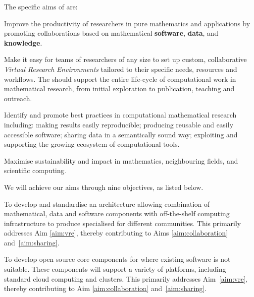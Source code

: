 \documentclass[noworkareas,deliverables,\classoptions]{euproposal}       %
\begin{document}
\begin{proposal}
The specific aims of \TheProject are:
\begin{compactenum}
\item \label{aim:collaboration} Improve the productivity of
  researchers in pure mathematics and applications by promoting
  collaborations based on mathematical \textbf{software},
  \textbf{data}, and \textbf{knowledge}.
\item \label{aim:vre} Make it easy for teams of researchers of any
  size to set up custom, collaborative \emph{Virtual Research
    Environments} tailored to their specific needs, resources and
  workflows. The \VREs should support the entire life-cycle of
  computational work in mathematical research, from initial
  exploration to publication, teaching and outreach.
\item \label{aim:sharing} Identify and promote best practices in
  computational mathematical research including: making results easily
  reproducible; producing reusable and easily accessible
  software; sharing data in a semantically sound way; exploiting and
  supporting the growing ecosystem of computational tools.
\item \label{aim:impact} Maximise sustainability and impact in
  mathematics, neighbouring fields, and scientific computing.
\end{compactenum}

We will achieve our aims through nine objectives, as listed below.

\begin{compactenum}
\item\label{objective:framework} To develop and standardise an
  architecture allowing combination of mathematical, data and software
  components with off-the-shelf computing infrastructure to produce
  specialised \VREs for different communities.
  This
  primarily addresses Aim \ref{aim:vre}, thereby contributing to Aims
  \ref{aim:collaboration} and~\ref{aim:sharing}. %

\item\label{objectives:core} To develop open source core components
  for \VREs where existing software is not suitable. These components
  will support a variety of platforms, including standard cloud
  computing and clusters. This primarily addresses Aim~\ref{aim:vre},
  thereby contributing to Aim \ref{aim:collaboration}
  and~\ref{aim:sharing}.


\end{compactenum}
\end{proposal}
\end{document}
